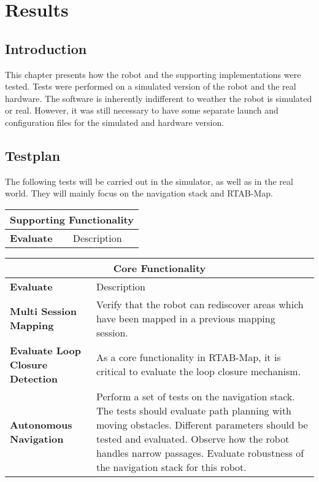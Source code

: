 \chapter{Results}
\label{chp:results} 

\section{Introduction}

This chapter presents how the robot and the supporting implementations were tested. Tests were performed on a simulated version of the robot and the real hardware. The software is inherently indifferent to weather the robot is simulated or real. However, it was still necessary to have some separate launch and configuration files for the simulated and hardware version. 

\section{Testplan}

The following tests will be carried out in the simulator, as well as in the real world. They will mainly focus on the navigation stack and \ac{RTAB-Map}. 

\begin{center}
	\begin{tabular}{ p{2.5cm} | p{7cm} }
		\multicolumn{2}{c}{Supporting Functionality}\\
		\hline
		\textbf{Evaluate} & Description\\
		\hline
	
	\end{tabular}
\end{center}

\begin{center}
	\begin{tabular}{ p{2.5cm} | p{7cm} }
	\multicolumn{2}{c}{Core Functionality}\\
\hline
	\textbf{Evaluate} & Description\\
	\hline
	\textbf{Multi Session Mapping} & Verify that the robot can rediscover areas which have been mapped in a previous mapping session.\\
	\textbf{Evaluate Loop Closure Detection} & As a core functionality in \ac{RTAB-Map}, it is critical to evaluate the loop closure mechanism.\\
	\textbf{Autonomous Navigation} & Perform a set of tests on the navigation stack. The tests should evaluate path planning with moving obstacles. Different parameters should be tested and evaluated. Observe how the robot handles narrow passages. Evaluate robustness of the navigation stack for this robot.\\
	\end{tabular}
\end{center}


